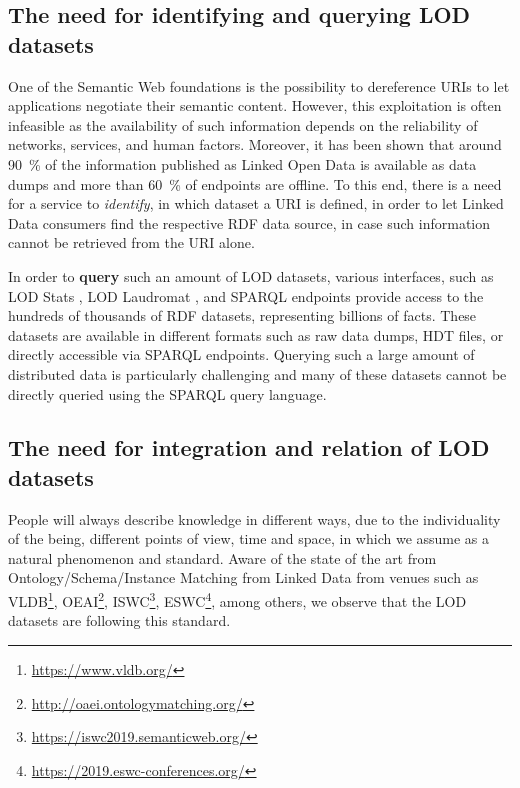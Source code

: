 \documentclass[sw]{iosart2x}
\begin{document}

\subsection{The need for identifying and querying LOD datasets}
One of the Semantic Web foundations is the possibility to dereference URIs to let applications negotiate their semantic content.
However, this exploitation is often infeasible as the availability of such information depends on the reliability of networks, services, and human factors.
Moreover, it has been shown that around \SI{90}{\percent} of the information published as Linked Open Data is available as data dumps and more than \SI{60}{\percent} of endpoints are offline\cite{hogan2016linked}.
To this end, there is a need for a service to \textit{identify}, in which dataset a URI is defined, in order to let Linked Data consumers find the respective RDF data source, in case such information cannot be retrieved from the URI alone.

In order to \textbf{query} such an amount of LOD datasets, various interfaces, such as LOD Stats \cite{auer2012lodstats}, LOD Laudromat \cite{beek2014lod}, and SPARQL endpoints provide access to the hundreds of thousands of RDF datasets, representing billions of facts.
These datasets are available in different formats such as raw data dumps, HDT files, or directly accessible via SPARQL endpoints.
Querying such a large amount of distributed data is particularly challenging and many of these datasets cannot be directly queried using the SPARQL query language. %

\subsection{The need for integration and relation of LOD datasets}

People will always describe knowledge in different ways, due to the individuality of the being, different points of view, time and space, in which we assume as a natural phenomenon and standard.
Aware of the state of the art from Ontology/Schema/Instance Matching from Linked Data from venues such as VLDB\footnote{\url{https://www.vldb.org/}}, OEAI\footnote{\url{http://oaei.ontologymatching.org/}}, ISWC\footnote{\url{https://iswc2019.semanticweb.org/}}, ESWC\footnote{\url{https://2019.eswc-conferences.org/}}, among others, we observe that the LOD datasets are following this standard.
\end{document}
